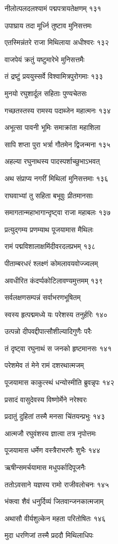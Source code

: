 नीलोत्पलदलश्यामं पद्मपत्रायतेक्षणम् १३१

उपाघ्राय तदा मूर्ध्नि तुष्टाव मुनिसत्तमः

एतस्मिन्नंतरे राजा मिथिलाया अधीश्वरः १३२

वाजपेयं क्रतुं यष्टुमारेभे मुनिसत्तमैः

तं द्रष्टुं प्रययुस्सर्वे विश्वामित्रपुरोगमाः १३३

मुनयो रघुशार्दूल सहिताः पुण्यचेतसः

गच्छतस्तस्य रामस्य पदाब्जेन महात्मनः १३४

अभूत्सा पावनी भूमिः समाक्रांता महाशिला

सापि शप्ता पुरा भर्त्रा गौतमेन द्विजन्मना १३५

अहल्या रघुनाथस्य पादस्पर्शाच्छुभाऽभवत्

अथ संप्राप्य नगरीं मिथिलां मुनिसत्तमाः १३६

राघवाभ्यां तु सहिता बभूवुः प्रीतमानसाः

समागतान्महाभागान्दृष्ट्वा राजा महाबलः १३७

प्रत्युद्गम्य प्रणम्याथ पूजयामास मैथिलः

रामं पद्मविशालाक्षमिंदीवरदलप्रभम् १३८

पीताम्बरधरं श्लक्ष्णं कोमलावयवोज्ज्वलम्

अवधीरित कंदर्प्पकोटिलावण्यमुत्तमम् १३९

सर्वलक्षणसम्पन्नं सर्वाभरणभूषितम्

स्वस्य हृत्पद्ममध्ये यः परेशस्य तनुर्हरिः १४०

उत्पन्नो दीपवद्दीपात्सौशील्यादिगुणैः परैः

तं दृष्ट्वा रघुनाथं स जनको हृष्टमानसः १४१

परेशमेव तं मेने रामं दशरथात्मजम्

पूजयामास काकुत्स्थं धन्योस्मीति ब्रुवन्नृपः १४२

प्रसादं वासुदेवस्य विष्णोर्मेने नरेश्वरः

प्रदातुं दुहितां तस्मै मनसा चिंतयन्प्रभुः १४३

आत्मजौ रघुवंशस्य ज्ञात्वा तत्र नृपोत्तमः

पूजयामास धर्मेण वस्त्रैराभरणैः शुभैः १४४

ऋषीन्समर्चयामास मधुपर्कादिपूजनैः

ततोऽवसाने यज्ञस्य रामो राजीवलोचनः १४५

भंक्त्वा शैवं धनुर्दिव्यं जितवान्जनकात्मजाम्

अथासौ वीर्यशुल्केन महता परितोषितः १४६

मुदा धरणिजां तस्मै प्रददौ मिथिलाधिपः

